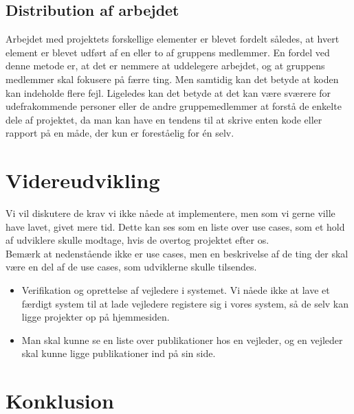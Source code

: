 \documentclass[12pt]{article}
\begin{document}
\subsection{Distribution af arbejdet}
Arbejdet med projektets forskellige elementer er blevet fordelt således, at hvert element er blevet udført af en eller to af gruppens medlemmer. En fordel ved denne metode er, at det er nemmere at uddelegere arbejdet, og at gruppens medlemmer skal fokusere på færre ting. Men samtidig kan det betyde at koden kan indeholde flere fejl. Ligeledes kan det betyde at det kan være sværere for udefrakommende personer eller de andre gruppemedlemmer at forstå de enkelte dele af projektet, da man kan have en tendens til at skrive enten kode eller rapport på en måde, der kun er foreståelig for én selv.

\section{Videreudvikling}
\label{sec:videreudvikling}
Vi vil diskutere de krav vi ikke nåede at implementere, men som vi gerne ville have lavet, givet mere tid. Dette kan ses som en liste over use cases, som et hold af udviklere skulle modtage, hvis de overtog projektet efter os.\\
Bemærk at nedenstående ikke er use cases, men en beskrivelse af de ting der skal være en del af de use cases, som udviklerne skulle tilsendes.\\
\begin{itemize}
\item Verifikation og oprettelse af vejledere i systemet. Vi nåede ikke at lave et færdigt system til at lade vejledere registere sig i vores system, så de selv kan ligge projekter op på hjemmesiden.
\item Man skal kunne se en liste over publikationer hos en vejleder, og en vejleder skal kunne ligge publikationer ind på sin side.
\end{itemize}

\newpage
\section{Konklusion}
\label{sec:konklusion}
\end{document}
